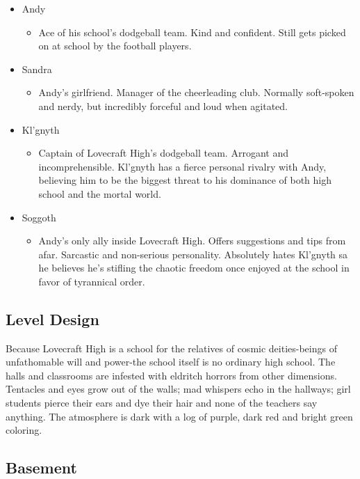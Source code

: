 \documentclass [12pt]{article}
\begin{document}
\begin{itemize}
\item Andy
	\begin{itemize}
	\item Ace of his school's dodgeball team. Kind and confident. Still gets picked on at school by the football players.
	\end{itemize}

\item Sandra
	\begin{itemize}
	\item Andy's girlfriend. Manager of the cheerleading club. Normally soft-spoken and nerdy, but incredibly forceful and loud when agitated.
	\end{itemize}

\item Kl'gnyth
	\begin{itemize}
	\item Captain of Lovecraft High's dodgeball team. Arrogant and incomprehensible. Kl'gnyth has a fierce personal rivalry with Andy, believing him to be the biggest threat to his dominance of both high school and the mortal world.
	\end{itemize}

\item Soggoth
	\begin{itemize}
	\item Andy's only ally inside Lovecraft High. Offers suggestions and tips from afar. Sarcastic and non-serious personality. Absolutely hates Kl'gnyth sa he believes he's stifling the chaotic freedom once enjoyed at the school in favor of tyrannical order.
	\end{itemize}
\end{itemize}

\subsection*{Level Design}

Because Lovecraft High is a school for the relatives of cosmic deities-beings of unfathomable will and power-the school itself is no ordinary high school. The halls and classrooms are infested with eldritch horrors from other dimensions. Tentacles and eyes grow out of the walls; mad whispers echo in the hallways; girl students pierce their ears and dye their hair and none of the teachers say anything. The atmosphere is dark with a log of purple, dark red and bright green coloring.

\subsection*{Basement}
\end{document}
